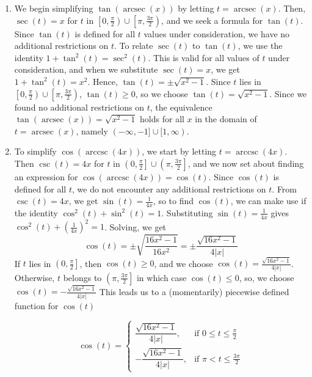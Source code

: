 {\begin{enumerate}
\begin{enumerate}
\item  We begin simplifying  $\tan(\operatorname{arcsec}(x))$ by letting $t = \operatorname{arcsec}(x)$.  Then, $\sec(t) = x$ for $t$ in $\left[0, \frac{\pi}{2} \right) \cup \left[\pi, \frac{3\pi}{2} \right)$, and we seek a formula for $\tan(t)$.  Since $\tan(t)$ is defined for all $t$ values under consideration, we have no additional restrictions on $t$.  To relate $\sec(t)$ to $\tan(t)$, we use the identity $1 + \tan^{2}(t) = \sec^{2}(t)$.  This is valid for all values of $t$ under consideration, and when we substitute $\sec(t) = x$, we get $1 + \tan^{2}(t) = x^2$.  Hence, $\tan(t) = \pm \sqrt{x^2-1}$. Since $t$ lies in $\left[0, \frac{\pi}{2} \right) \cup \left[\pi, \frac{3\pi}{2} \right)$, $\tan(t) \geq 0$, so we choose $\tan(t) = \sqrt{x^2-1}$.  Since we found no additional restrictions on $t$, the equivalence $\tan(\operatorname{arcsec}(x)) = \sqrt{x^2-1}$ holds for all $x$ in the domain of $t = \operatorname{arcsec}(x)$, namely $(-\infty, -1] \cup [1,\infty)$.

\item To simplify $\cos(\operatorname{arccsc}(4x))$, we start by letting $t = \operatorname{arccsc}(4x)$.   Then $\csc(t) = 4x$ for $t$ in $\left(0, \frac{\pi}{2} \right] \cup \left(\pi, \frac{3\pi}{2} \right]$, and we now set about finding an expression for  $\cos(\operatorname{arccsc}(4x)) = \cos(t)$.  Since $\cos(t)$ is defined for all $t$, we do not encounter any additional restrictions on $t$.  From $\csc(t) = 4x$, we get $\sin(t) = \frac{1}{4x}$, so to find $\cos(t)$, we can make use if the identity $\cos^{2}(t) + \sin^{2}(t) = 1$.  Substituting $\sin(t) = \frac{1}{4x}$  gives $\cos^{2}(t) + \left(\frac{1}{4x}\right)^2 = 1$.  Solving, we get \[\cos(t) = \pm \sqrt{\frac{16x^2-1}{16x^2}} = \pm \frac{\sqrt{16x^2-1}}{4|x|}\]  If $t$ lies in $\left(0, \frac{\pi}{2} \right]$, then $\cos(t) \geq 0$, and we choose  $\cos(t) = \frac{\sqrt{16x^2-1}}{4|x|}$. Otherwise, $t$ belongs to $\left( \pi, \frac{3\pi}{2} \right]$ in which case $\cos(t) \leq 0$, so, we choose $\cos(t) = -\frac{\sqrt{16x^2-1}}{4|x|}$ This leads us to a (momentarily) piecewise defined function for $\cos(t)$

\[ 
\cos(t) = \left\{ \begin{array}{rr}
			 \dfrac{\sqrt{16x^2-1}}{4|x|}, & \text{if $0 \leq t \leq \frac{\pi}{2}$} \\ [10pt]
			   -\dfrac{\sqrt{16x^2-1}}{4|x|}, & \text{if $\pi < t \leq \frac{3\pi}{2}$}  
			    \end{array}\right. 
\]


\end{enumerate}
\end{enumerate}}
